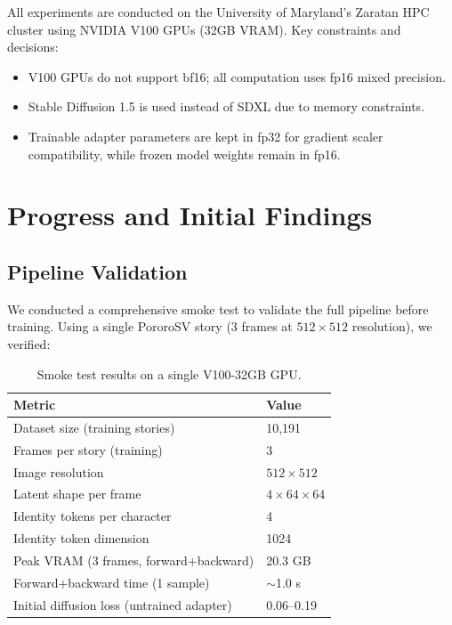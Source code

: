 \documentclass[11pt]{article}
\begin{document}
All experiments are conducted on the University of Maryland's Zaratan HPC cluster using NVIDIA V100 GPUs (32GB VRAM). Key constraints and decisions:

\begin{itemize}[leftmargin=*]
    \item V100 GPUs do not support bf16; all computation uses fp16 mixed precision.
    \item Stable Diffusion 1.5 is used instead of SDXL due to memory constraints.
    \item Trainable adapter parameters are kept in fp32 for gradient scaler compatibility, while frozen model weights remain in fp16.
\end{itemize}

\section{Progress and Initial Findings}

\subsection{Pipeline Validation}

We conducted a comprehensive smoke test to validate the full pipeline before training. Using a single PororoSV story (3 frames at $512 \times 512$ resolution), we verified:

\begin{table}[h]
\centering
\caption{Smoke test results on a single V100-32GB GPU.}
\begin{tabular}{ll}
\toprule
\textbf{Metric} & \textbf{Value} \\
\midrule
Dataset size (training stories) & 10,191 \\
Frames per story (training) & 3 \\
Image resolution & $512 \times 512$ \\
Latent shape per frame & $4 \times 64 \times 64$ \\
Identity tokens per character & 4 \\
Identity token dimension & 1024 \\
Peak VRAM (3 frames, forward+backward) & 20.3 GB \\
Forward+backward time (1 sample) & $\sim$1.0 s \\
Initial diffusion loss (untrained adapter) & 0.06--0.19 \\
\bottomrule
\end{tabular}
\label{tab:smoke}
\end{table}
\end{document}
